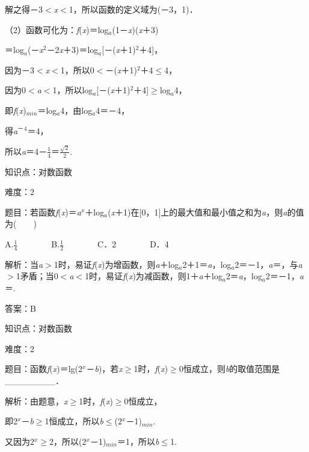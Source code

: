 \documentclass{article} %
\begin{document}
解之得－3$\mathrm{<}$\textit{x}$\mathrm{<}$1，所以函数的定义域为(－3，1)．

（2）函数可化为：\textit{f}(\textit{x})＝log\textit{${}_{a}$}(1－\textit{x})(\textit{x}＋3)

＝log\textit{${}_{a}$}(－\textit{x}${}^{2}$－2\textit{x}＋3)＝log\textit{${}_{a}$}[－(\textit{x}＋1)${}^{2}$＋4]，

因为－3$\mathrm{<}$\textit{x}$\mathrm{<}$1，所以0$\mathrm{<}$－(\textit{x}＋1)${}^{2}$＋4$\mathrm{\le}$4，

因为0$\mathrm{<}$\textit{a}$\mathrm{<}$1，所以log\textit{${}_{a}$}[－(\textit{x}＋1)${}^{2}$＋4]$\mathrm{\ge}$log\textit{${}_{a}$}4，

即\textit{f}(\textit{x})${}_{min}$＝log\textit{${}_{a}$}4，由log\textit{${}_{a}$}4＝－4，

得\textit{a}${}^{\textrm{－}}$${}^{4}$＝4，

所以\textit{a}＝4－$\frac{1}{4}$＝$\frac{\sqrt{2}}{2}$.

知识点：对数函数

难度：2

题目：若函数\textit{f}(\textit{x})＝\textit{a${}^{x}$}＋log\textit{${}_{a}$}(\textit{x}＋1)在[0，1]上的最大值和最小值之和为\textit{a}，则\textit{a}的值为(　　)

A.$\frac{1}{4}$　　　　B.$\frac{1}{2}$　　　　C．2　　　　D．4

解析：当\textit{a}$\mathrm{>}$1时，易证\textit{f}(\textit{x})为增函数，则\textit{a}＋log\textit{${}_{a}$}2＋1＝\textit{a}，log\textit{${}_{a}$}2＝－1，\textit{a}＝，与\textit{a}$\mathrm{>}$1矛盾；当0$\mathrm{<}$\textit{a}$\mathrm{<}$1时，易证\textit{f}(\textit{x})为减函数，则1＋\textit{a}＋log\textit{${}_{a}$}2＝\textit{a}，log\textit{${}_{a}$}2＝－1，\textit{a}＝.

答案：B

知识点：对数函数

难度：2

题目：函数\textit{f}(\textit{x})＝lg(2\textit{${}^{x}$}－\textit{b})，若\textit{x}$\mathrm{\ge}$1时，\textit{f}(\textit{x})$\mathrm{\ge}$0恒成立，则\textit{b}的取值范围是\_\_\_\_\_\_\_\_．

解析：由题意，\textit{x}$\mathrm{\ge}$1时，\textit{f}(\textit{x})$\mathrm{\ge}$0恒成立，

即2\textit{${}^{x}$}－\textit{b}$\mathrm{\ge}$1恒成立，所以\textit{b}$\mathrm{\le}$(2\textit{${}^{x}$}－1)${}_{min}$.

又因为2\textit{${}^{x}$}$\mathrm{\ge}$2，所以(2\textit{${}^{x}$}－1)${}_{min}$＝1，所以\textit{b}$\mathrm{\le}$1.
\end{document}
